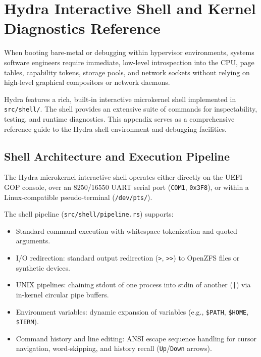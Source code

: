 \chapter{Hydra Interactive Shell and Kernel Diagnostics Reference}
\label{app:shell_diagnostics}

When booting bare-metal or debugging within hypervisor environments, systems software engineers require immediate, low-level introspection into the CPU, page tables, capability tokens, storage pools, and network sockets without relying on high-level graphical compositors or network daemons.

Hydra features a rich, built-in interactive microkernel shell implemented in \texttt{src/shell/}. The shell provides an extensive suite of commands for inspectability, testing, and runtime diagnostics. This appendix serves as a comprehensive reference guide to the Hydra shell environment and debugging facilities.

\section{Shell Architecture and Execution Pipeline}
\label{sec:shell_architecture}

The Hydra microkernel interactive shell operates either directly on the UEFI GOP console, over an 8250/16550 UART serial port (\texttt{COM1}, \texttt{0x3F8}), or within a Linux-compatible pseudo-terminal (\texttt{/dev/pts/}).

The shell pipeline (\texttt{src/shell/pipeline.rs}) supports:
\begin{itemize}
    \item Standard command execution with whitespace tokenization and quoted arguments.
    \item I/O redirection: standard output redirection (\texttt{>}, \texttt{>>}) to OpenZFS files or synthetic devices.
    \item UNIX pipelines: chaining stdout of one process into stdin of another (\texttt{|}) via in-kernel circular pipe buffers.
    \item Environment variables: dynamic expansion of variables (e.g., \texttt{\$PATH}, \texttt{\$HOME}, \texttt{\$TERM}).
    \item Command history and line editing: ANSI escape sequence handling for cursor navigation, word-skipping, and history recall (\texttt{Up}/\texttt{Down} arrows).
\end{itemize}

